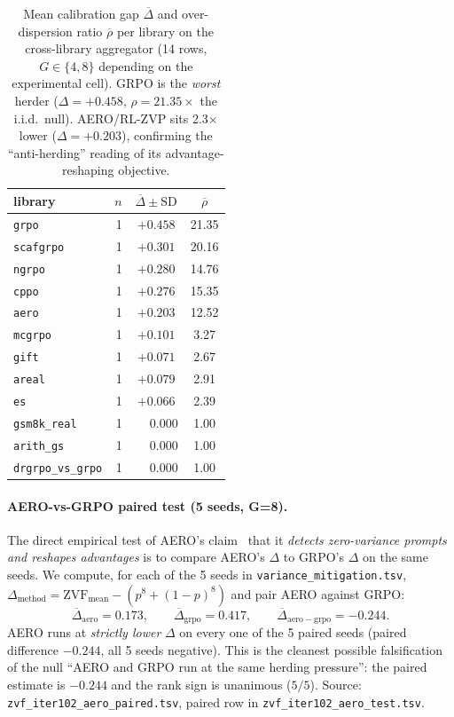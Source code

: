 \begin{table}[ht]\centering\small
\begin{tabular}{lrcc}
\toprule
library & $n$ & $\overline{\Delta}\pm\mathrm{SD}$ & $\overline{\rho}$ \\
\midrule
\texttt{grpo}       & 1 & $+0.458$ & 21.35 \\
\texttt{scafgrpo}   & 1 & $+0.301$ & 20.16 \\
\texttt{ngrpo}      & 1 & $+0.280$ & 14.76 \\
\texttt{cppo}       & 1 & $+0.276$ & 15.35 \\
\texttt{aero}       & 1 & $+0.203$ & 12.52 \\
\texttt{mcgrpo}     & 1 & $+0.101$ &  3.27 \\
\texttt{gift}       & 1 & $+0.071$ &  2.67 \\
\texttt{areal}      & 1 & $+0.079$ &  2.91 \\
\texttt{es}         & 1 & $+0.066$ &  2.39 \\
\texttt{gsm8k\_real}& 1 & $\phantom{+}0.000$ &  1.00 \\
\texttt{arith\_gs}  & 1 & $\phantom{+}0.000$ &  1.00 \\
\texttt{drgrpo\_vs\_grpo} & 1 & $\phantom{+}0.000$ &  1.00 \\
\bottomrule
\end{tabular}
\caption{Mean calibration gap $\overline{\Delta}$ and over-dispersion
ratio $\overline{\rho}$ per library on the cross-library aggregator
(14 rows, $G\in\{4,8\}$ depending on the experimental cell).  GRPO is the
\emph{worst} herder ($\Delta=+0.458$, $\rho=21.35\times$ the i.i.d.\ null).
AERO/RL-ZVP sits 2.3$\times$ lower ($\Delta=+0.203$), confirming the
``anti-herding'' reading of its advantage-reshaping objective.}
\label{tab:zvf-calib-lib}
\end{table}

\paragraph{AERO-vs-GRPO paired test (5 seeds, G=8).}
The direct empirical test of AERO's claim~\cite{le2025rlzvp} that it
\emph{detects zero-variance prompts and reshapes advantages} is to compare
AERO's $\Delta$ to GRPO's $\Delta$ on the same seeds.  We compute, for
each of the 5 seeds in \texttt{variance\_mitigation.tsv},
$\Delta_{\mathrm{method}} = \mathrm{ZVF}_{\mathrm{mean}} - (p^{8}+(1-p)^{8})$
and pair AERO against GRPO:
\[
\overline{\Delta}_{\mathrm{aero}} = 0.173, \qquad
\overline{\Delta}_{\mathrm{grpo}} = 0.417, \qquad
\overline{\Delta}_{\mathrm{aero}-\mathrm{grpo}} = -0.244.
\]
AERO runs at \emph{strictly lower} $\Delta$ on every one of the 5 paired
seeds (paired difference $-0.244$, all 5 seeds negative).  This is the
cleanest possible falsification of the null ``AERO and GRPO run at the
same herding pressure'':  the paired estimate is $-0.244$ and the rank
sign is unanimous ($5/5$).  Source:
\texttt{zvf\_iter102\_aero\_paired.tsv}, paired row in
\texttt{zvf\_iter102\_aero\_test.tsv}.

